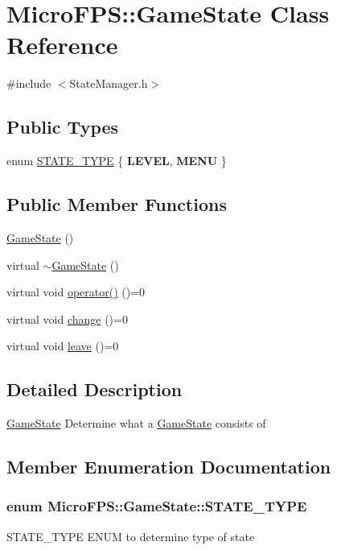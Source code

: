 \hypertarget{class_micro_f_p_s_1_1_game_state}{
\section{MicroFPS::GameState Class Reference}
\label{df/dc6/class_micro_f_p_s_1_1_game_state}
}


{\ttfamily \#include $<$StateManager.h$>$}

\subsection*{Public Types}
\begin{DoxyCompactItemize}
\item 
enum \hyperlink{class_micro_f_p_s_1_1_game_state_a2473115955f3009dae963b45f6a45ef3}{STATE\_\-TYPE} \{ {\bfseries LEVEL}, 
{\bfseries MENU}
 \}
\end{DoxyCompactItemize}
\subsection*{Public Member Functions}
\begin{DoxyCompactItemize}
\item 
\hyperlink{class_micro_f_p_s_1_1_game_state_a9ff190c74054ce2a3f5f5dd82601fc42}{GameState} ()
\item 
virtual \hyperlink{class_micro_f_p_s_1_1_game_state_ac7ed58f354a2a1e5d1942f5d361a9dab}{$\sim$GameState} ()
\item 
virtual void \hyperlink{class_micro_f_p_s_1_1_game_state_ab0e7cbccd49d6c0be93ba6ad0edb3436}{operator()} ()=0
\item 
virtual void \hyperlink{class_micro_f_p_s_1_1_game_state_a45db2d9ce96ac103465f798145f86927}{change} ()=0
\item 
virtual void \hyperlink{class_micro_f_p_s_1_1_game_state_a3e8da39e3c244a903a4e26252f9856a6}{leave} ()=0
\end{DoxyCompactItemize}


\subsection{Detailed Description}
\hyperlink{class_micro_f_p_s_1_1_game_state}{GameState} Determine what a \hyperlink{class_micro_f_p_s_1_1_game_state}{GameState} consists of 

\subsection{Member Enumeration Documentation}
\hypertarget{class_micro_f_p_s_1_1_game_state_a2473115955f3009dae963b45f6a45ef3}{
\subsubsection[{STATE\_\-TYPE}]{\setlength{\rightskip}{0pt plus 5cm}enum {\bf MicroFPS::GameState::STATE\_\-TYPE}}}
\label{df/dc6/class_micro_f_p_s_1_1_game_state_a2473115955f3009dae963b45f6a45ef3}
STATE\_\-TYPE ENUM to determine type of state 

